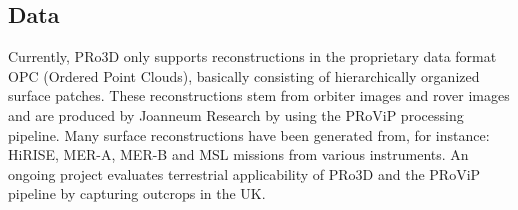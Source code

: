 \subsection{Data}
\label{sec:data}

Currently, PRo3D only supports reconstructions in the proprietary data format OPC (Ordered Point Clouds), basically consisting of hierarchically organized surface patches. These reconstructions stem from orbiter images and rover images and are produced by Joanneum Research by using the PRoViP processing pipeline. Many surface reconstructions have been generated from, for instance: HiRISE, MER-A, MER-B and MSL missions from various instruments. An ongoing project evaluates terrestrial applicability of PRo3D and the PRoViP pipeline by capturing outcrops in the UK. 

